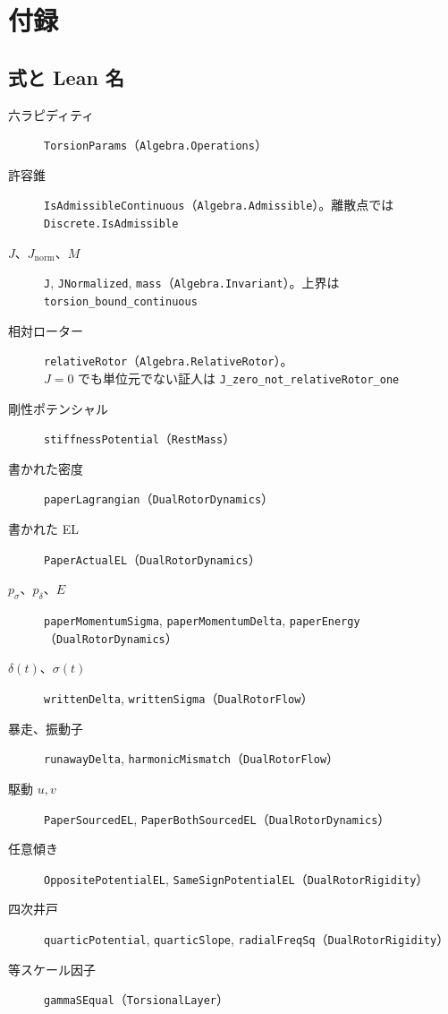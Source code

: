 \section{付録}
\label{sec:appendix}

\subsection{式と Lean 名}

\begin{description}
\item[六ラピディティ] \texttt{TorsionParams}（\texttt{Algebra.Operations}）
\item[許容錐] \texttt{IsAdmissibleContinuous}（\texttt{Algebra.Admissible}）。離散点では \texttt{Discrete.IsAdmissible}
\item[\(J\)、\(J_{\mathrm{norm}}\)、\(M\)] \texttt{J}, \texttt{JNormalized}, \texttt{mass}（\texttt{Algebra.Invariant}）。上界は \texttt{torsion\_bound\_continuous}
\item[相対ローター] \texttt{relativeRotor}（\texttt{Algebra.RelativeRotor}）。\\
\(J=0\) でも単位元でない証人は \texttt{J\_zero\_not\_relativeRotor\_one}
\item[剛性ポテンシャル] \texttt{stiffnessPotential}（\texttt{RestMass}）
\item[書かれた密度] \texttt{paperLagrangian}（\texttt{DualRotorDynamics}）
\item[書かれた EL] \texttt{PaperActualEL}（\texttt{DualRotorDynamics}）
\item[\(p_\sigma\)、\(p_\delta\)、\(E\)] \texttt{paperMomentumSigma}, \texttt{paperMomentumDelta}, \texttt{paperEnergy}（\texttt{DualRotorDynamics}）
\item[\(\delta(t)\)、\(\sigma(t)\)] \texttt{writtenDelta}, \texttt{writtenSigma}（\texttt{DualRotorFlow}）
\item[暴走、振動子] \texttt{runawayDelta}, \texttt{harmonicMismatch}（\texttt{DualRotorFlow}）
\item[駆動 \(u,v\)] \texttt{PaperSourcedEL}, \texttt{PaperBothSourcedEL}（\texttt{DualRotorDynamics}）
\item[任意傾き] \texttt{OppositePotentialEL}, \texttt{SameSignPotentialEL}（\texttt{DualRotorRigidity}）
\item[四次井戸] \texttt{quarticPotential}, \texttt{quarticSlope}, \texttt{radialFreqSq}（\texttt{DualRotorRigidity}）
\item[等スケール因子] \texttt{gammaSEqual}（\texttt{TorsionalLayer}）

\end{description}
